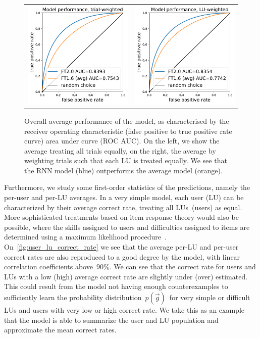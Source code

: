 \begin{figure}[ht]
\centering
\begin{tabular}{cc}
\includegraphics[width=0.4\linewidth]{figures/lingvist/roc_trial.pdf} &
\includegraphics[width=0.4\linewidth]{figures/lingvist/roc_lu.pdf} \\
\end{tabular}
\caption[Overall knowledge estimation model performance]{Overall average performance of the model, as characterised by the receiver operating characteristic (false positive to true positive rate curve) area under curve (ROC AUC). On the left, we show the average treating all trials equally, on the right, the average by weighting trials such that each LU is treated equally. We see that the RNN model (blue) outperforms the average model (orange).} 
\label{fig:roc} 
\end{figure} 

Furthermore, we study some first-order statistics of the predictions, namely the per-user and per-LU averages. In a very simple model, each user (LU) can be characterized by their average correct rate, treating all LUs (users) as equal. More sophisticated treatments based on item response theory would also be possible, where the skills assigned to users and difficulties assigned to items are determined using a maximum likelihood procedure~\cite{embretson2013item}. On~\cref{fig:user_lu_correct_rate} we see that the average per-LU and per-user correct rates are also reproduced to a good degree by the model, with linear correlation coefficients above~$90\%$. We can see that the correct rate for users and LUs with a low (high) average correct rate are slightly under (over) estimated. This could result from the model not having enough counterexamples to sufficiently learn the probability distribution~$p(\vec{g})$~for very simple or difficult LUs and users with very low or high correct rate. We take this as an example that the model is able to summarize the user and LU population and approximate the mean correct rates.

